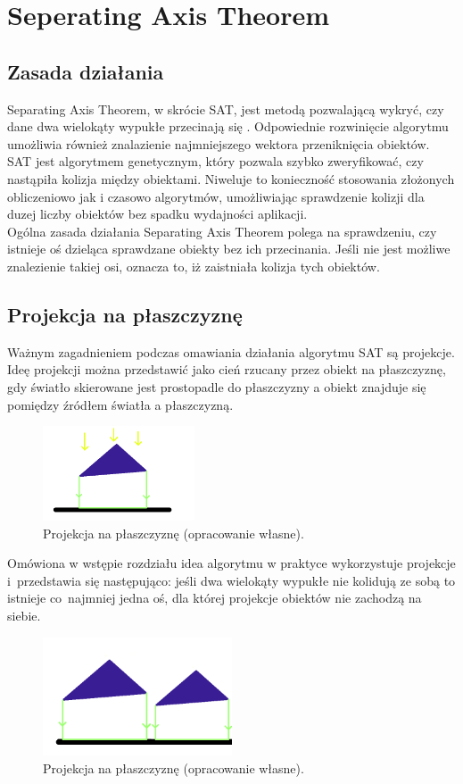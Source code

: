 \chapter{Seperating Axis Theorem}

\section{Zasada działania}
Separating Axis Theorem, w skrócie SAT, jest metodą pozwalającą wykryć, czy dane dwa wielokąty wypukłe przecinają się \cite{SAT}. Odpowiednie rozwinięcie algorytmu umożliwia również znalazienie najmniejszego wektora przeniknięcia obiektów.  SAT jest algorytmem genetycznym, który pozwala szybko zweryfikować, czy nastąpiła kolizja między obiektami. Niweluje to konieczność stosowania złożonych obliczeniowo jak i czasowo algorytmów, umożliwiając sprawdzenie kolizji dla duzej liczby obiektów bez spadku wydajności aplikacji.\\
Ogólna zasada działania Separating Axis Theorem polega na sprawdzeniu, czy istnieje oś dzieląca sprawdzane obiekty bez ich przecinania. Jeśli nie jest możliwe znalezienie takiej osi, oznacza to, iż zaistniała kolizja tych obiektów.

\section{Projekcja na płaszczyznę}
Ważnym zagadnieniem podczas omawiania działania algorytmu SAT są projekcje. Ideę projekcji można przedstawić jako cień rzucany przez obiekt na płaszczyznę, gdy światło skierowane jest prostopadle do płaszczyzny a obiekt znajduje się pomiędzy źródłem światła a płaszczyzną.
\begin{figure}[h]
\centering
\includegraphics[width=0.4\textwidth]{figures/projection.png}
\caption{Projekcja na płaszczyznę (opracowanie własne).}%
\label{rys:Projekcja na plaszczyzne}
\end{figure}
\newpage
Omówiona w wstępie rozdziału idea algorytmu w praktyce wykorzystuje projekcje i~przedstawia się następująco: jeśli dwa wielokąty wypukłe nie kolidują ze sobą to istnieje co~najmniej jedna oś, dla której projekcje obiektów nie zachodzą na siebie.
\begin{figure}[h]
\centering
\includegraphics[width=0.5\textwidth]{figures/projection2.png}
\caption{Projekcja na płaszczyznę (opracowanie własne).}%
\label{rys:Projekcja na plaszczyzne}
\end{figure}

